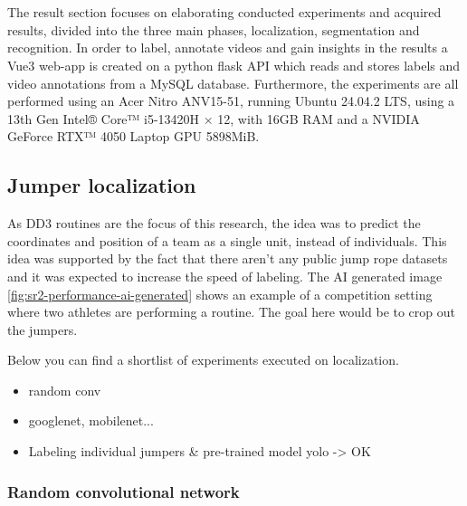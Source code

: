 
\chapter{}%
\label{ch:results}

The result section focuses on elaborating conducted experiments and acquired results, divided into the three main phases, localization, segmentation and recognition. In order to label, annotate videos and gain insights in the results a Vue3 web-app is created on a python flask API which reads and stores labels and video annotations from a MySQL database. Furthermore, the experiments are all performed using an Acer Nitro ANV15-51, running Ubuntu 24.04.2 LTS, using a 13th Gen Intel® Core™ i5-13420H × 12, with 16GB RAM and a NVIDIA GeForce RTX™ 4050 Laptop GPU 5898MiB.

\section{Jumper localization}

As DD3 routines are the focus of this research, the idea was to predict the coordinates and position of a team as a single unit, instead of individuals. This idea was supported by the fact that there aren't any public jump rope datasets and it was expected to increase the speed of labeling. The AI generated image \ref{fig:sr2-performance-ai-generated} shows an example of a competition setting where two athletes are performing a routine. The goal here would be to crop out the jumpers.


Below you can find a shortlist of experiments executed on localization.

\begin{itemize}
    \item random conv
    \item googlenet, mobilenet...
    \item Labeling individual jumpers \& pre-trained model yolo -> OK
\end{itemize}

\subsection{Random convolutional network}

